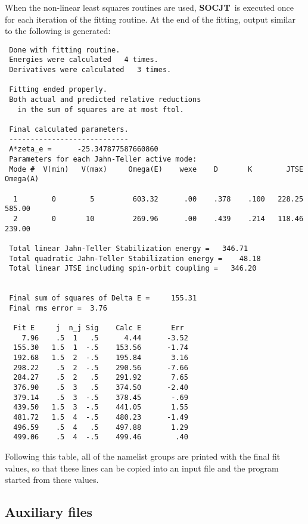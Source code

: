 \documentclass{article}
\newcommand{\socjt}{{\bf SOCJT}}
\begin{document}
When the non-linear least squares routines are used, \socjt\ is
executed once for each iteration of the fitting routine. At the end of
the fitting, output similar to the following is generated:
\begin{verbatim}
 Done with fitting routine.
 Energies were calculated   4 times.
 Derivatives were calculated   3 times.
 
 Fitting ended properly.
 Both actual and predicted relative reductions
   in the sum of squares are at most ftol.
 
 Final calculated parameters.
 ----------------------------
 A*zeta_e =      -25.347877587660860
 Parameters for each Jahn-Teller active mode:
 Mode #  V(min)   V(max)     Omega(E)    wexe    D       K        JTSE  Omega(A)
 
  1        0        5         603.32      .00    .378    .100   228.25    585.00
  2        0       10         269.96      .00    .439    .214   118.46    239.00
 
 Total linear Jahn-Teller Stabilization energy =   346.71
 Total quadratic Jahn-Teller Stabilization energy =    48.18
 Total linear JTSE including spin-orbit coupling =   346.20
 
 
 Final sum of squares of Delta E =     155.31
 Final rms error =  3.76
 
  Fit E     j  n_j Sig    Calc E       Err
    7.96    .5  1   .5      4.44      -3.52
  155.30   1.5  1  -.5    153.56      -1.74
  192.68   1.5  2  -.5    195.84       3.16
  298.22    .5  2  -.5    290.56      -7.66
  284.27    .5  2   .5    291.92       7.65
  376.90    .5  3   .5    374.50      -2.40
  379.14    .5  3  -.5    378.45       -.69
  439.50   1.5  3  -.5    441.05       1.55
  481.72   1.5  4  -.5    480.23      -1.49
  496.59    .5  4   .5    497.88       1.29
  499.06    .5  4  -.5    499.46        .40
\end{verbatim}

Following this table, all of the namelist groups are printed with the
final fit values, so that these lines can be copied into an input file
and the program started from these values.

\subsection{Auxiliary files} \label{section:outputaux}
\end{document}
